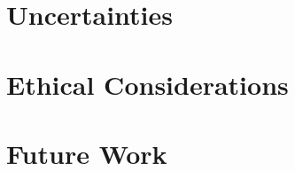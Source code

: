 \documentclass{senior-design}
\begin{document}
\section{Uncertainties}
\section{Ethical Considerations}
\section{Future Work}

\clearpage
\renewcommand*{\UrlFont}{\rmfamily}
\printbibliography[title={References},heading=bibintoc]
\thispagestyle{references}
\clearpage
\end{document}
